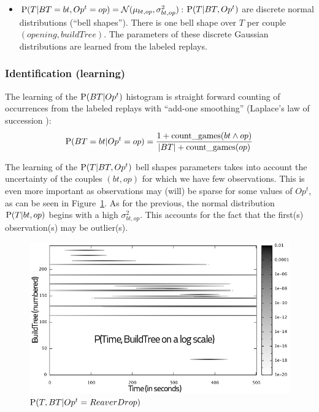 \begin{itemize}
\item $\mathrm{P}(T | BT=bt, Op^t=op) = \mathcal{N}(\mu_{bt,op},\sigma_{bt,op}^2)$: $\mathrm{P}(T|BT,Op^t)$ are discrete normal distributions (``bell shapes''). There is one bell shape over $T$ per couple $(opening, buildTree)$. The parameters of these discrete Gaussian distributions are learned from the labeled replays.
\end{itemize}

\subsubsection{Identification (learning)}
The learning of the $\mathrm{P}(BT | Op^t)$ histogram is straight forward counting of occurrences from the labeled replays with ``add-one smoothing'' (Laplace's law of succession \citep{Jaynes}):
$$\mathrm{P}(BT=bt|Op^t=op) = \frac{1 + \mathrm{count\_games}(bt\wedge op)}{\left\lvert BT\right\rvert + \mathrm{count\_games}(op)}$$

The learning of the $\mathrm{P}(T | BT, Op^t)$ bell shapes parameters takes into account the uncertainty of the couples $(bt, op)$ for which we have few observations. This is even more important as observations may (will) be sparse for some values of $Op^t$, as can be seen in Figure~\ref{fig:sparseBTOp}. As for the previous, the normal distribution $\mathrm{P}(T|bt, op)$ begins with a high $\sigma_{bt,op}^2$. This accounts for the fact that the first(s) observation(s) may be outlier(s). %

\begin{figure}[htp]
\centerline{\includegraphics[width=0.52\columnwidth]{images/BW_HeatMap_knowing_ReaverDrop.png}}
\caption{$\mathrm{P}(T, BT | Op^t=ReaverDrop)$}
\label{fig:sparseBTOp}
\end{figure}


